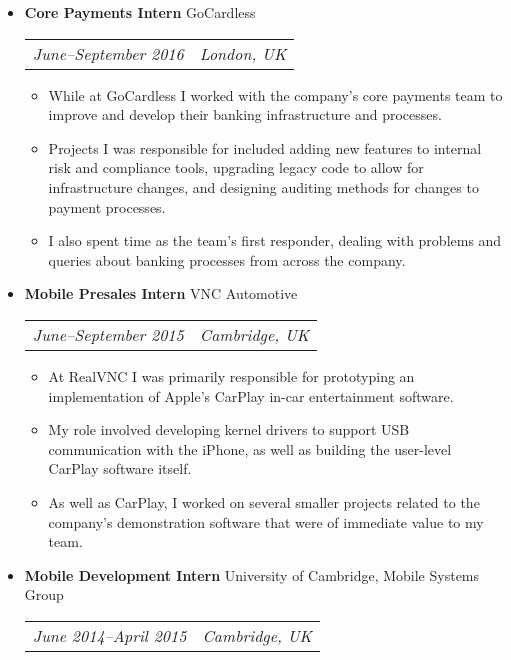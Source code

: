 \documentclass[letterpaper]{article}
\begin{document}
\begin{itemize}

    \item \textbf{Core Payments Intern} GoCardless \\
        \begin{tabular}{c|c}
            \emph{June--September 2016} & \emph{London, UK}
        \end{tabular}
        \begin{itemize}
          \item While at GoCardless I worked with the company's core payments
            team to improve and develop their banking infrastructure and
            processes.
          \item Projects I was responsible for included adding new features to
            internal risk and compliance tools, upgrading legacy code to allow
            for infrastructure changes, and designing auditing methods for
            changes to payment processes.
          \item I also spent time as the team's first responder, dealing with
            problems and queries about banking processes from across the
            company.
        \end{itemize}

    \item \textbf{Mobile Presales Intern} VNC Automotive \\
        \begin{tabular}{c|c}
            \emph{June--September 2015} & \emph{Cambridge, UK}
        \end{tabular}
        \begin{itemize}
            \item At RealVNC I was primarily responsible for prototyping an
                implementation of Apple's CarPlay in-car entertainment software.
            \item My role involved developing kernel drivers to support USB
                communication with the iPhone, as well as building the
                user-level CarPlay software itself.
            \item As well as CarPlay, I worked on several smaller projects
                related to the company's demonstration software that were of
                immediate value to my team.
        \end{itemize}

    
    \item \textbf{Mobile Development Intern} University of Cambridge, Mobile Systems Group \\
		\begin{tabular}{c|c}
            \emph{June 2014--April 2015} & \emph{Cambridge, UK}
		\end{tabular}
		\begin{itemize}


\end{itemize}
\end{itemize}
\end{document}
